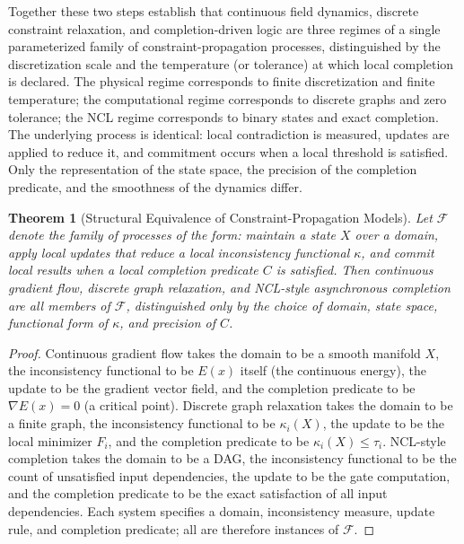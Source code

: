 \documentclass[12pt,a4paper,openany]{book}
\theoremstyle{plain}
\newtheorem{theorem}{Theorem}[chapter]
\theoremstyle{definition}
\theoremstyle{remark}
\begin{document}
Together these two steps establish that continuous field dynamics, discrete constraint relaxation, and completion-driven logic are three regimes of a single parameterized family of constraint-propagation processes, distinguished by the discretization scale and the temperature (or tolerance) at which local completion is declared. The physical regime corresponds to finite discretization and finite temperature; the computational regime corresponds to discrete graphs and zero tolerance; the NCL regime corresponds to binary states and exact completion. The underlying process is identical: local contradiction is measured, updates are applied to reduce it, and commitment occurs when a local threshold is satisfied. Only the representation of the state space, the precision of the completion predicate, and the smoothness of the dynamics differ.

\begin{theorem}[Structural Equivalence of Constraint-Propagation Models]
Let $\mathcal{F}$ denote the family of processes of the form: maintain a state $X$ over a domain, apply local updates that reduce a local inconsistency functional $\kappa$, and commit local results when a local completion predicate $C$ is satisfied. Then continuous gradient flow, discrete graph relaxation, and NCL-style asynchronous completion are all members of $\mathcal{F}$, distinguished only by the choice of domain, state space, functional form of $\kappa$, and precision of $C$.
\end{theorem}

\begin{proof}
Continuous gradient flow takes the domain to be a smooth manifold $X$, the inconsistency functional to be $E(x)$ itself (the continuous energy), the update to be the gradient vector field, and the completion predicate to be $\nabla E(x) = 0$ (a critical point). Discrete graph relaxation takes the domain to be a finite graph, the inconsistency functional to be $\kappa_i(X)$, the update to be the local minimizer $F_i$, and the completion predicate to be $\kappa_i(X) \leq \tau_i$. NCL-style completion takes the domain to be a DAG, the inconsistency functional to be the count of unsatisfied input dependencies, the update to be the gate computation, and the completion predicate to be the exact satisfaction of all input dependencies. Each system specifies a domain, inconsistency measure, update rule, and completion predicate; all are therefore instances of $\mathcal{F}$.
\end{proof}
\end{document}
